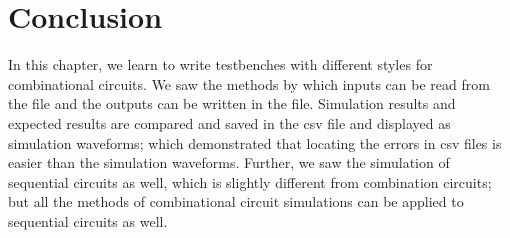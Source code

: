 


\section{Conclusion}
In this chapter, we learn to write testbenches with different styles for combinational circuits. We saw the methods by which inputs can be read from the file and the outputs can be written in the file. Simulation results and expected results are compared and saved in the csv file and displayed as simulation waveforms; which demonstrated that locating the errors in csv files is easier than the simulation waveforms. Further, we saw the simulation of sequential circuits as well, which is slightly different from combination circuits; but all the methods of combinational circuit simulations can be applied to sequential circuits as well. 